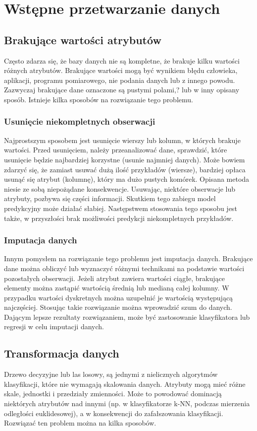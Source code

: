  
\section{Wstępne przetwarzanie danych}
\subsection{Brakujące wartości atrybutów}
Często zdarza się, że bazy danych nie są kompletne, że brakuje kilku wartości różnych atrybutów. Brakujące wartości mogą być wynikiem błędu człowieka, aplikacji, programu pomiarowego, nie podania danych lub z innego powodu. Zazwyczaj brakujące dane oznaczone są pustymi polami,? lub w inny opisany sposób. Istnieje kilka sposobów na rozwiązanie tego problemu.
\subsubsection{Usunięcie niekompletnych obserwacji}
Najprostszym sposobem jest usunięcie wierszy lub kolumn, w których brakuje wartości. Przed usunięciem, należy przeanalizować dane, sprawdzić, które usunięcie będzie najbardziej korzystne (usunie najmniej danych). Może bowiem zdarzyć się, że zamiast usuwać dużą ilość przykładów (wiersze), bardziej opłaca usunąć się atrybut (kolumnę), który ma dużo pustych komórek. Opisana metoda niesie ze sobą niepożądane konsekwencje. Usuwając, niektóre obserwacje lub atrybuty, pozbywa się części informacji. Skutkiem tego zabiegu model predykcyjny może działać słabiej. Następstwem stosowania tego sposobu jest także, w przyszłości brak możliwości predykcji niekompletnych przykładów.
\subsubsection{Imputacja danych}
Innym pomysłem na rozwiązanie tego problemu jest imputacja danych. Brakujące dane można obliczyć lub wyznaczyć różnymi technikami na podstawie wartości pozostałych obserwacji. Jeżeli atrybut zawiera wartości ciągłe, brakujące elementy można zastąpić wartością średnią lub medianą całej kolumny. W przypadku wartości dyskretnych można uzupełnić je wartością występującą najczęściej. Stosując takie rozwiązanie można wprowadzić szum do danych. Dającym lepsze rezultaty rozwiązaniem, może być zastosowanie klasyfikatora lub regresji w celu imputacji danych.
\subsection{Transformacja danych}
Drzewo decyzyjne lub las losowy, są jednymi z nielicznych algorytmów klasyfikacji, które nie wymagają skalowania danych. Atrybuty mogą mieć różne skale, jednostki i przedziały zmienności. Może to powodować dominacją niektórych atrybutów nad innymi (np. w klasyfikatorze k-NN, podczas mierzenia odległości euklidesowej), a w konsekwencji do zafałszowania klasyfikacji. Rozwiązać ten problem można na kilka sposobów.
